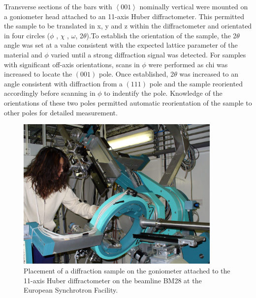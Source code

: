Transverse sections of the bars with $\left<001\right>$ nominally vertical were mounted on a goniometer head attached to an 11-axis Huber diffractometer.  This permitted the sample to be translated in x, y and z within the diffractometer and orientated in four circles ($\phi$ , $\chi$ , $\omega$, 2$\theta$).To establish the orientation of the sample, the 2$\theta$ angle was set at a value consistent with the expected lattice parameter of the material and $\phi$ varied until a strong diffraction signal was detected.  For samples with significant off-axis orientations, scans in $\phi$ were performed as chi was increased to locate the $\left(001\right)$ pole.  Once established, 2$\theta$ was increased to an angle consistent with diffraction from a $\left(111\right)$ pole and the sample reoriented accordingly before scanning in $\phi$ to indentify the pole.  Knowledge of the orientations of these two poles permitted automatic reorientation of the sample to other poles for detailed measurement.
%
\begin{figure}[H]
\begin{center}
\includegraphics[width=10cm]{esrfgonio}
\caption{Placement of a diffraction sample on the goniometer attached to the 11-axis Huber diffractometer on the beamline BM28 at the European Synchrotron Facility.}\label{fig:esrfgonio}
\end{center}
\end{figure}
%

